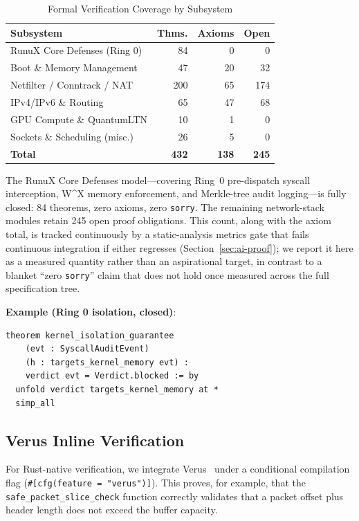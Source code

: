 \documentclass[sigconf,nonacm=false]{acmart}
\begin{document}
\begin{table}[t]
\caption{Formal Verification Coverage by Subsystem}
\label{tab:formal-verification}
\small
\begin{tabular}{lrrr}
\toprule
\textbf{Subsystem} & \textbf{Thms.} & \textbf{Axioms} & \textbf{Open} \\
\midrule
RunuX Core Defenses (Ring 0)  & 84  & 0   & 0 \\
Boot \& Memory Management     & 47  & 20  & 32 \\
Netfilter / Conntrack / NAT   & 200 & 65  & 174 \\
IPv4/IPv6 \& Routing          & 65  & 47  & 68 \\
GPU Compute \& QuantumLTN     & 10  & 1   & 0 \\
Sockets \& Scheduling (misc.) & 26  & 5   & 0 \\
\midrule
\textbf{Total}                & \textbf{432} & \textbf{138} & \textbf{245} \\
\bottomrule
\end{tabular}
\end{table}

The RunuX Core Defenses model---covering Ring~0 pre-dispatch syscall interception, W\textasciicircum X memory enforcement, and Merkle-tree audit logging---is fully closed: 84 theorems, zero axioms, zero \texttt{sorry}. The remaining network-stack modules retain 245 open proof obligations. This count, along with the axiom total, is tracked continuously by a static-analysis metrics gate that fails continuous integration if either regresses (Section~\ref{sec:ai-proof}); we report it here as a measured quantity rather than an aspirational target, in contrast to a blanket ``zero \texttt{sorry}'' claim that does not hold once measured across the full specification tree.

\textbf{Example (Ring 0 isolation, closed)}:
\begin{lstlisting}[caption={A fully-proved theorem from the RunuxDefenses model.},label=lst:lean]
theorem kernel_isolation_guarantee
    (evt : SyscallAuditEvent)
    (h : targets_kernel_memory evt) :
    verdict evt = Verdict.blocked := by
  unfold verdict targets_kernel_memory at *
  simp_all
\end{lstlisting}

\subsection{Verus Inline Verification}
For Rust-native verification, we integrate Verus~\cite{Verus2023} under a conditional compilation flag (\texttt{\#[cfg(feature = "verus")]}). This proves, for example, that the \texttt{safe\_packet\_slice\_check} function correctly validates that a packet offset plus header length does not exceed the buffer capacity.
\end{document}
